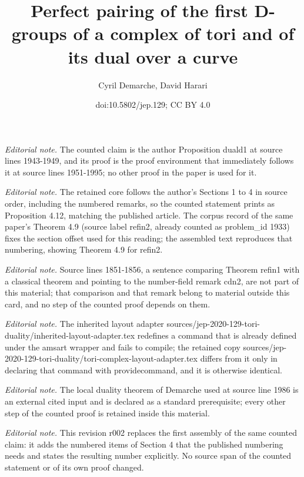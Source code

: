 \documentclass[10pt,a4paper]{amsart}
\title{Perfect pairing of the first D-groups of a complex of tori and of its dual over a curve}
\author{Cyril Demarche, David Harari}
\date{doi:10.5802/jep.129; CC BY 4.0}
\theoremstyle{plain}
\theoremstyle{definition}
\begin{document}
\maketitle
\noindent\textit{Editorial note.} The counted claim is the author Proposition duald1 at source lines 1943-1949, and its proof is the proof environment that immediately follows it at source lines 1951-1995; no other proof in the paper is used for it.\par\medskip
\noindent\textit{Editorial note.} The retained core follows the author's Sections 1 to 4 in source order, including the numbered remarks, so the counted statement prints as Proposition 4.12, matching the published article. The corpus record of the same paper's Theorem 4.9 (source label refin2, already counted as problem\_id 1933) fixes the section offset used for this reading; the assembled text reproduces that numbering, showing Theorem 4.9 for refin2.\par\medskip
\noindent\textit{Editorial note.} Source lines 1851-1856, a sentence comparing Theorem refin1 with a classical theorem and pointing to the number-field remark cdn2, are not part of this material; that comparison and that remark belong to material outside this card, and no step of the counted proof depends on them.\par\medskip
\noindent\textit{Editorial note.} The inherited layout adapter sources/jep-2020-129-tori-duality/inherited-layout-adapter.tex redefines a command that is already defined under the amsart wrapper and fails to compile; the retained copy sources/jep-2020-129-tori-duality/tori-complex-layout-adapter.tex differs from it only in declaring that command with providecommand, and it is otherwise identical.\par\medskip
\noindent\textit{Editorial note.} The local duality theorem of Demarche used at source line 1986 is an external cited input and is declared as a standard prerequisite; every other step of the counted proof is retained inside this material.\par\medskip
\noindent\textit{Editorial note.} This revision r002 replaces the first assembly of the same counted claim: it adds the numbered items of Section 4 that the published numbering needs and states the resulting number explicitly. No source span of the counted statement or of its own proof changed.\par\medskip
\end{document}
